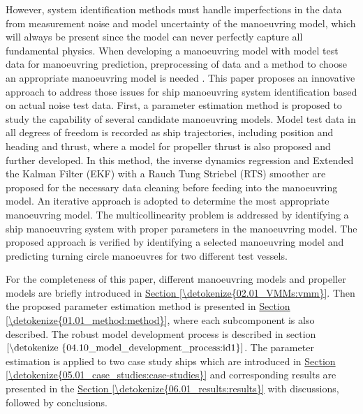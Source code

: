 \documentclass[review]{elsarticle}
\begin{document}
\sphinxAtStartPar
However, system identification methods must handle imperfections in the data from measurement noise and model uncertainty of the manoeuvring model, which will always be present since the model can never perfectly capture all fundamental physics. When developing a manoeuvring model with model test data for manoeuvring prediction, preprocessing of data and a method to choose an appropriate manoeuvring model is needed \cite{alexandersson_comparison_2022}.
This paper proposes an innovative approach to address those issues for ship manoeuvring system identification based on actual noise test data. First, a parameter estimation method  is proposed to study the capability of several candidate manoeuvring models. Model test data in all degrees of freedom is recorded as ship trajectories, including position and heading and thrust, where a model for propeller thrust is also proposed and further developed. In this method, the inverse dynamics regression and Extended the Kalman Filter (EKF) with a Rauch Tung Striebel (RTS) smoother \cite{rauch_maximum_1965} are proposed for the necessary data cleaning before feeding into the manoeuvring model. An iterative approach is adopted to determine the most appropriate manoeuvring model. The multicollinearity problem is addressed by identifying a ship manoeuvring system with proper parameters in the manoeuvring model. The proposed approach is verified by identifying a selected manoeuvring model and predicting turning circle manoeuvres for two different test vessels.

\sphinxAtStartPar
For the completeness of this paper, different manoeuvring models and propeller models are briefly introduced in \hyperref[\detokenize{02.01_VMMs:vmm}]{Section \ref{\detokenize{02.01_VMMs:vmm}}}. Then the proposed parameter estimation method is presented in \hyperref[\detokenize{01.01_method:method}]{Section \ref{\detokenize{01.01_method:method}}}, where each subcomponent is also described. The robust model development process is described in section \(\ref{\detokenize{04.10_model_development_process:id1}}\). The parameter estimation is applied to two case study ships which are introduced in \hyperref[\detokenize{05.01_case_studies:case-studies}]{Section \ref{\detokenize{05.01_case_studies:case-studies}}} and corresponding results are presented in the \hyperref[\detokenize{06.01_results:results}]{Section \ref{\detokenize{06.01_results:results}}} with discussions, followed by conclusions.
\end{document}
